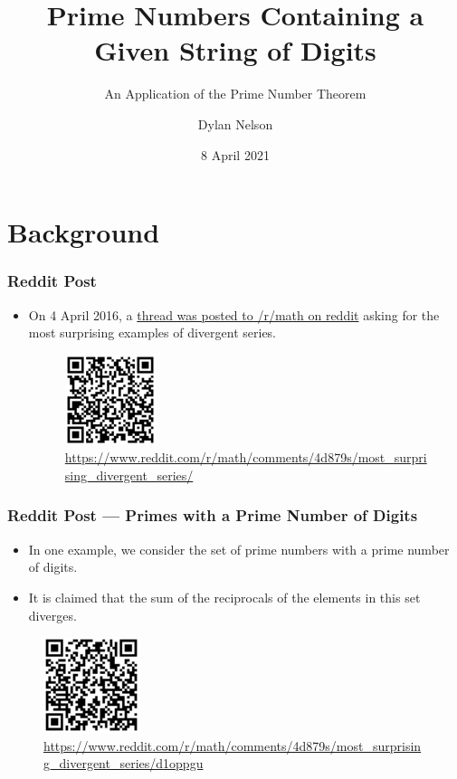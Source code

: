 \documentclass{beamer}
\title[Prime Strings]{Prime Numbers Containing a Given String of Digits}
\subtitle{An Application of the Prime Number Theorem}
\author{Dylan Nelson}
\institute[SUMS]{Stellenbosch University Mathematics Society}
\date{8 April 2021}
\begin{document}
\frame{\titlepage}

\section{Background}

\begin{frame}
    \frametitle{Reddit Post}

    \begin{itemize}
        \item On 4 April 2016, a \href{https://www.reddit.com/r/math/comments/4d879s/most_surprising_divergent_series/}{thread was posted to /r/math on reddit} asking for the most surprising examples of divergent series.
        \begin{figure}
            \centering
            \includegraphics[width=0.25\textwidth]{reddit_thread.png}
            \caption{\url{https://www.reddit.com/r/math/comments/4d879s/most_surprising_divergent_series/}}
        \end{figure}
    \end{itemize}

\end{frame}

\begin{frame}
    \frametitle{Reddit Post — Primes with a Prime Number of Digits}

    \begin{itemize}
        \item In one example, we consider the set of prime numbers with a prime number of digits. \pause
        \item It is claimed that the sum of the reciprocals of the elements in this set diverges.
    \end{itemize}

    \begin{figure}
        \centering
        \includegraphics[width=0.25\textwidth]{reddit_prime_number_of_digits.png}
        \caption{\url{https://www.reddit.com/r/math/comments/4d879s/most_surprising_divergent_series/d1oppgu}}
    \end{figure}

\end{frame}
\end{document}
